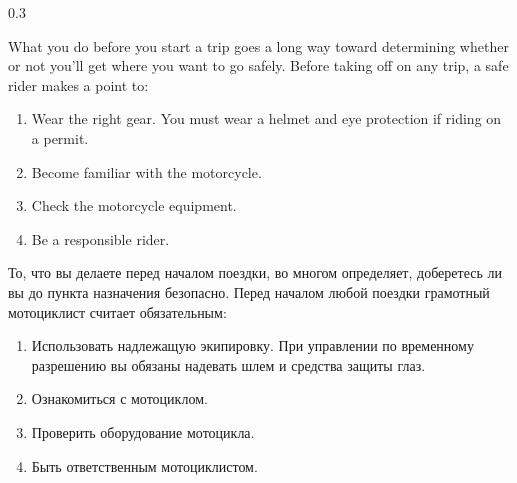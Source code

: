 
\begin{langblock}{0.3}
	\begin{eng}
	What you do before you start a trip goes a long way toward determining whether or not you'll get where you want to go safely. Before taking off on any trip, a safe rider makes a point to:
	\begin{enumerate}[noitemsep]
		\bfseries
		\item Wear the right gear. You must wear a helmet and eye protection if riding on a permit.
		\item Become familiar with the motorcycle.
		\item Check the motorcycle equipment.
		\item Be a responsible rider.
	\end{enumerate}
	\end{eng}
	\begin{rus}
		То, что вы делаете перед началом поездки, во многом определяет, доберетесь ли вы до пункта назначения безопасно. Перед началом любой поездки грамотный мотоциклист считает обязательным:
		\begin{enumerate}[noitemsep]
			\bfseries
			\item Использовать надлежащую экипировку. При управлении по временному разрешению вы обязаны надевать шлем и средства защиты глаз.
			\item Ознакомиться с мотоциклом.
			\item Проверить оборудование мотоцикла.
			\item Быть ответственным мотоциклистом.
		\end{enumerate}
	\end{rus}
\end{langblock}